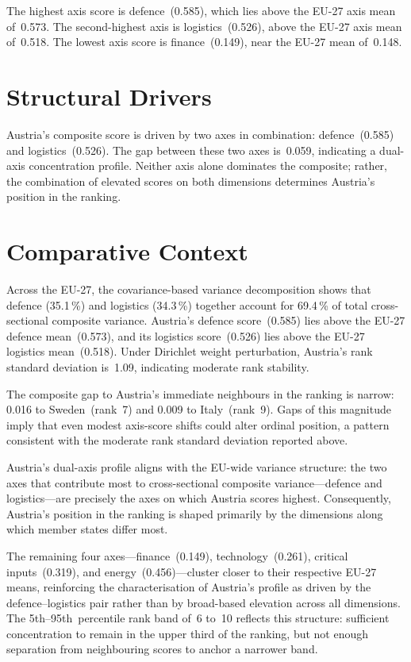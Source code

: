 \documentclass[12pt,a4paper]{article}
\begin{document}
The highest axis score is defence~(0.585), which lies above the EU-27 axis mean of~0.573.  The second-highest axis is logistics~(0.526), above the EU-27 axis mean of~0.518.  The lowest axis score is finance~(0.149), near the EU-27 mean of~0.148.


\section{Structural Drivers}
\label{sec:drivers}

\begin{sloppypar}
Austria's composite score is driven by two axes in combination: defence~(0.585) and logistics~(0.526).  The gap between these two axes is~0.059, indicating a dual-axis concentration profile.  Neither axis alone dominates the composite; rather, the combination of elevated scores on both dimensions determines Austria's position in the ranking.
\end{sloppypar}


\section{Comparative Context}
\label{sec:comparative}

Across the EU-27, the covariance-based variance decomposition shows that defence (35.1\,\%) and logistics (34.3\,\%) together account for 69.4\,\% of total cross-sectional composite variance.  Austria's defence score~(0.585) lies above the EU-27 defence mean~(0.573), and its logistics score~(0.526) lies above the EU-27 logistics mean~(0.518).  Under Dirichlet weight perturbation, Austria's rank standard deviation is~1.09, indicating moderate rank stability.

The composite gap to Austria's immediate neighbours in the ranking is narrow: 0.016 to Sweden~(rank~7) and 0.009 to Italy~(rank~9).  Gaps of this magnitude imply that even modest axis-score shifts could alter ordinal position, a pattern consistent with the moderate rank standard deviation reported above.

Austria's dual-axis profile aligns with the EU-wide variance structure: the two axes that contribute most to cross-sectional composite variance---defence and logistics---are precisely the axes on which Austria scores highest.  Consequently, Austria's position in the ranking is shaped primarily by the dimensions along which member states differ most.

The remaining four axes---finance~(0.149), technology~(0.261), critical inputs~(0.319), and energy~(0.456)---cluster closer to their respective EU-27 means, reinforcing the characterisation of Austria's profile as driven by the defence--logistics pair rather than by broad-based elevation across all dimensions.  The 5th--95th~percentile rank band of~6 to~10 reflects this structure: sufficient concentration to remain in the upper third of the ranking, but not enough separation from neighbouring scores to anchor a narrower band.
\end{document}
